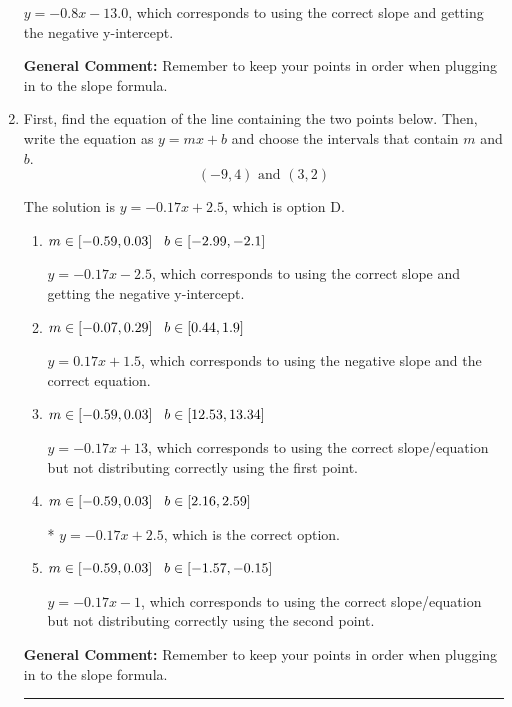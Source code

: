 \documentclass{extbook}[14pt]
\newcommand{\litem}[1]{\item #1

\rule{\textwidth}{0.4pt}}
\begin{document}
\begin{enumerate}
{\begin{enumerate}[label=\Alph*.]
 $y = -0.8x -13.0$, which corresponds to using the correct slope and getting the negative y-intercept.
\end{enumerate}

\textbf{General Comment:} Remember to keep your points in order when plugging in to the slope formula.
}
\litem{
First, find the equation of the line containing the two points below. Then, write the equation as $ y=mx+b $ and choose the intervals that contain $m$ and $b$.
\[ (-9, 4) \text{ and } (3, 2) \]

The solution is \( y = -0.17x + 2.5 \), which is option D.\begin{enumerate}[label=\Alph*.]
\item \( m \in [-0.59, 0.03] \hspace*{3mm} b \in [-2.99, -2.1] \)

 $y = -0.17x -2.5$, which corresponds to using the correct slope and getting the negative y-intercept.
\item \( m \in [-0.07, 0.29] \hspace*{3mm} b \in [0.44, 1.9] \)

 $y = 0.17x + 1.5$, which corresponds to using the negative slope and the correct equation.
\item \( m \in [-0.59, 0.03] \hspace*{3mm} b \in [12.53, 13.34] \)

 $y = -0.17x + 13$, which corresponds to using the correct slope/equation but not distributing correctly using the first point.
\item \( m \in [-0.59, 0.03] \hspace*{3mm} b \in [2.16, 2.59] \)

* $y = -0.17x + 2.5$, which is the correct option.
\item \( m \in [-0.59, 0.03] \hspace*{3mm} b \in [-1.57, -0.15] \)

 $y = -0.17x -1$, which corresponds to using the correct slope/equation but not distributing correctly using the second point.
\end{enumerate}

\textbf{General Comment:} Remember to keep your points in order when plugging in to the slope formula.
}
\end{enumerate}
\end{document}
